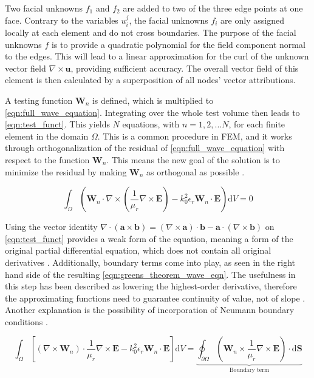 Two facial unknowns $f_1$ and $f_2$ are added to two of the three edge points at one face. Contrary to the variables $u_i^j$, the facial unknowns $f_i$ are only assigned locally at each element and do not cross boundaries. The purpose of the facial unknowns $f$ is to provide a quadratic polynomial for the field component normal to the edges. This will lead to a linear approximation for the curl of the unknown vector field $\nabla\times \mathbf{u}$, providing sufficient accuracy. The overall vector field of this element is then calculated by a superposition of all nodes' vector attributions.


A testing function $\mathbf{W}_n$ is defined, which is multiplied to \autoref{eqn:full_wave_equation}. Integrating over the whole test volume then leads to \autoref{eqn:test_funct}. This yields $N$ equations, with $n=1,2,...N$, for each finite element in the domain $\Omega$. This is a common procedure in FEM, and it works through orthogonalization of the residual of \autoref{eqn:full_wave_equation} with respect to the function $\mathbf{W}_n$. This means the new goal of the solution is to minimize the residual by making $\mathbf{W}_n$ as orthogonal as possible \cite{Mohsen_1982}.

\begin{equation}
    \int_\Omega\left( \mathbf{W}_n\cdot\nabla \times\left( \frac{1}{\mu_r}\nabla\times\mathbf{E} \right)-k_0^2\epsilon_r\mathbf{W}_n\cdot\mathbf{E} \right)\mathrm{d}V=0
    \label{eqn:test_funct}
\end{equation}

Using the vector identity $\nabla\cdot\left(\mathbf{a}\times\mathbf{b}\right)=\left(\nabla\times\mathbf{a}\right)\cdot\mathbf{b}-\mathbf{a}\cdot\left(\nabla\times\mathbf{b}\right)$  on \autoref{eqn:test_funct} provides a weak form of the equation, meaning a form of the original partial differential equation, which does not contain all original derivatives \cite{Cendes_Lee_1988,Cendes_1991}. Additionally, boundary terms come into play, as seen in the right hand side of the resulting \autoref{eqn:greens_theorem_wave_eqn}. The usefulness in this step has been described as lowering the highest-order derivative, therefore the approximating functions need to guarantee continuity of value, not of slope \cite{huebner2001finite}. Another explanation is the possibility of incorporation of Neumann boundary conditions \cite{Mohsen_1982}. 

\begin{equation}
    \int_\Omega \left[ \left(\nabla \times \mathbf{W}_n \right)\cdot \frac{1}{\mu_r}\nabla\times \mathbf{E}-k_0^2\epsilon_r\mathbf{W}_n\cdot\mathbf{E}\right]\mathrm{d}V=\underbrace{\oint_{\partial\Omega}\left( \mathbf{W}_n\times \frac{1}{\mu_r}\nabla\times\mathbf{E}\right)\cdot\mathrm{d}\mathbf{S}}_{\text{Boundary term}}
    \label{eqn:greens_theorem_wave_eqn}
\end{equation}

